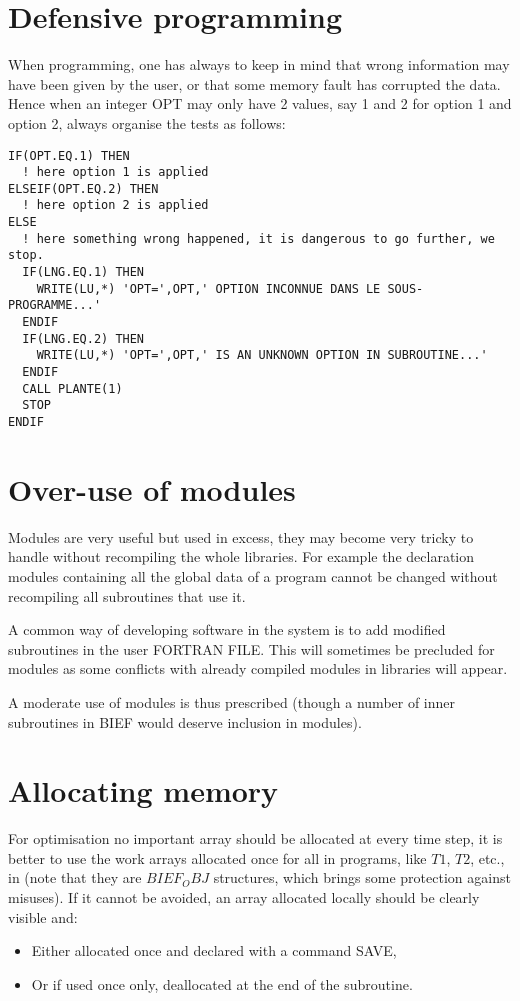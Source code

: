 \section{Defensive programming}

When programming, one has always to keep in mind that wrong information may
have been given by the user, or that some memory fault has corrupted the data.
Hence when an integer OPT may only have 2 values, say 1 and 2 for option 1 and
option 2, always organise the tests as follows:\\
\begin{lstlisting}
IF(OPT.EQ.1) THEN
  ! here option 1 is applied
ELSEIF(OPT.EQ.2) THEN
  ! here option 2 is applied
ELSE
  ! here something wrong happened, it is dangerous to go further, we stop.
  IF(LNG.EQ.1) THEN
    WRITE(LU,*) 'OPT=',OPT,' OPTION INCONNUE DANS LE SOUS-PROGRAMME...'
  ENDIF
  IF(LNG.EQ.2) THEN
    WRITE(LU,*) 'OPT=',OPT,' IS AN UNKNOWN OPTION IN SUBROUTINE...'
  ENDIF
  CALL PLANTE(1)
  STOP
ENDIF
\end{lstlisting}

\section{Over-use of modules}

Modules are very useful but used in excess, they may become very tricky to
handle without recompiling the whole libraries. For example the declaration
modules containing all the global data of a program cannot be changed without
recompiling all subroutines that use it.

A common way of developing software in the \telemacsystem system is to add modified
subroutines in the user FORTRAN FILE. This will sometimes be precluded for
modules as some conflicts with already compiled modules in libraries will
appear.

A moderate use of modules is thus prescribed (though a number of inner
subroutines in BIEF would deserve inclusion in modules).

\section{Allocating memory}


For optimisation no important array should be allocated at every time step, it
is better to use the work arrays allocated once for all in \telemacsystem programs,
like $T1$, $T2$, etc., in  (note that they are $BIEF_OBJ$ structures, which
brings some protection against misuses).  If it cannot be avoided, an array
allocated locally should be clearly visible and:\\
\begin{itemize}
\item Either allocated once and declared with a command SAVE,
\item Or if used once only, deallocated at the end of the subroutine.
\end{itemize}

